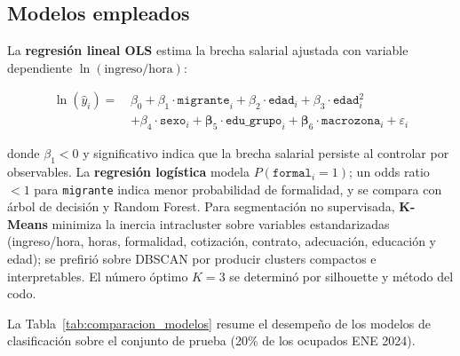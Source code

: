 \subsection{Modelos empleados}




La \textbf{regresión lineal OLS} estima la brecha salarial ajustada con variable dependiente $\ln(\text{ingreso/hora})$:

\begin{align*}
	\ln(\hat{y}_i) = \,&\beta_0 + \beta_1 \cdot \texttt{migrante}_i + \beta_2 \cdot \texttt{edad}_i + \beta_3 \cdot \texttt{edad}^2_i \\
	&+ \beta_4 \cdot \texttt{sexo}_i + \boldsymbol{\beta}_5 \cdot \texttt{edu\_grupo}_i + \boldsymbol{\beta}_6 \cdot \texttt{macrozona}_i + \varepsilon_i
\end{align*}

donde $\beta_1 < 0$ y significativo indica que la brecha salarial persiste al controlar por observables. La \textbf{regresión logística} modela $P(\texttt{formal}_i = 1)$; un odds ratio $<1$ para \texttt{migrante} indica menor probabilidad de formalidad, y se compara con árbol de decisión y Random Forest. Para segmentación no supervisada, \textbf{K-Means} minimiza la inercia intracluster sobre variables estandarizadas (ingreso/hora, horas, formalidad, cotización, contrato, adecuación, educación y edad); se prefirió sobre DBSCAN por producir clusters compactos e interpretables. El número óptimo $K = 3$ se determinó por silhouette y método del codo.


La Tabla~\ref{tab:comparacion_modelos} resume el desempeño de los modelos de clasificación sobre el conjunto de prueba (20\% de los ocupados ENE 2024).

